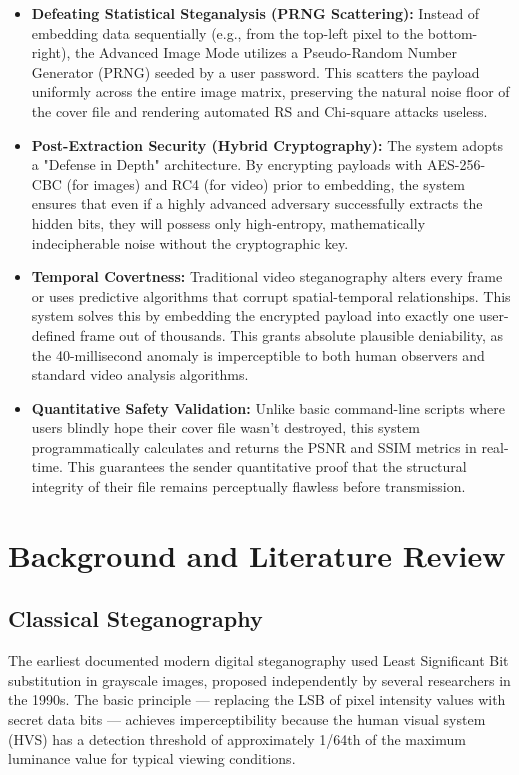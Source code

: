 \documentclass[12pt,a4paper]{report}
\begin{document}
\begin{itemize}
    \item \textbf{Defeating Statistical Steganalysis (PRNG Scattering):} Instead of embedding data sequentially (e.g., from the top-left pixel to the bottom-right), the Advanced Image Mode utilizes a Pseudo-Random Number Generator (PRNG) seeded by a user password. This scatters the payload uniformly across the entire image matrix, preserving the natural noise floor of the cover file and rendering automated RS and Chi-square attacks useless.
    \item \textbf{Post-Extraction Security (Hybrid Cryptography):} The system adopts a "Defense in Depth" architecture. By encrypting payloads with AES-256-CBC (for images) and RC4 (for video) prior to embedding, the system ensures that even if a highly advanced adversary successfully extracts the hidden bits, they will possess only high-entropy, mathematically indecipherable noise without the cryptographic key.
    \item \textbf{Temporal Covertness:} Traditional video steganography alters every frame or uses predictive algorithms that corrupt spatial-temporal relationships. This system solves this by embedding the encrypted payload into exactly one user-defined frame out of thousands. This grants absolute plausible deniability, as the 40-millisecond anomaly is imperceptible to both human observers and standard video analysis algorithms.
    \item \textbf{Quantitative Safety Validation:} Unlike basic command-line scripts where users blindly hope their cover file wasn't destroyed, this system programmatically calculates and returns the PSNR and SSIM metrics in real-time. This guarantees the sender quantitative proof that the structural integrity of their file remains perceptually flawless before transmission.
\end{itemize}

\chapter{Background and Literature Review}

\section{Classical Steganography}
The earliest documented modern digital steganography used Least Significant Bit substitution in grayscale images, proposed independently by several researchers in the 1990s. The basic principle — replacing the LSB of pixel intensity values with secret data bits — achieves imperceptibility because the human visual system (HVS) has a detection threshold of approximately 1/64th of the maximum luminance value for typical viewing conditions.
\end{document}
